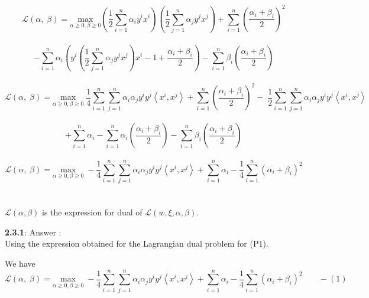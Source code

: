 \documentclass[a4paper,11pt]{article}
\begin{document}
\begin{mlsolution}
\[
  \mathcal{L}\left ( \alpha,\; \beta  \right ) = \underset{\alpha\geq 0, \beta \geq 0 }{\text{max}} \left ( \frac{1}{2}\sum_{i=1}^{n} \alpha_{i}y^{i}x^{i}  \right )\left ( \frac{1}{2}\sum_{j=1}^{n} \alpha_{j}y^{j}x^{j} \right ) + \sum_{i=1}^{n} \left ( \frac{\alpha_{i} + \beta_{i}}{2} \right )^{2}  \]\\\[ - \sum_{i=1}^{n} \alpha_{i}\left ( y^{i}\left ( \frac{1}{2}\sum_{j=1}^{n} \alpha_{j}y^{j}x^{j}  \right )x^{i} - 1  +  \frac{\alpha_{i} + \beta_{i}}{2} \right ) - \sum_{i=1}^{n} \beta_{i} \left ( \frac{\alpha_{i} + \beta_{i}}{2}  \right )
\]\\

\[
  \mathcal{L}\left ( \alpha,\; \beta  \right ) = \underset{\alpha\geq 0, \beta \geq 0 }{\text{max}} \; \frac{1}{4}\sum_{i=1}^{n}\sum_{j=1}^{n}\alpha_{i}\alpha_{j}y^{i}y^{j}\left \langle x^{i}, x^{j} \right \rangle+ \sum_{i=1}^{n} \left ( \frac{\alpha_{i} + \beta_{i}}{2} \right )^{2} -\; \frac{1}{2}\sum_{i=1}^{n}\sum_{j=1}^{n}\alpha_{i}\alpha_{j}y^{i}y^{j}\left \langle x^{i}, x^{j} \right \rangle \]\\\[ + \sum_{i=1}^{n}\alpha_{i} - \sum_{i=1}^{n} \alpha_{i} \left ( \frac{\alpha_{i} + \beta_{i}}{2}  \right ) - \sum_{i=1}^{n} \beta_{i} \left ( \frac{\alpha_{i} + \beta_{i}}{2}  \right )
\]\\

\[
  \mathcal{L}\left ( \alpha,\; \beta  \right ) = \underset{\alpha\geq 0, \beta \geq 0 }{\text{max}} \; -\frac{1}{4}\sum_{i=1}^{n}\sum_{j=1}^{n}\alpha_{i}\alpha_{j}y^{i}y^{j}\left \langle x^{i}, x^{j} \right \rangle+ \sum_{i=1}^{n}\alpha_{i} - \frac{1}{4}\sum_{i=1}^{n} \left ( \alpha_{i} + \beta_{i} \right )^{2}
\]\\\\

$\mathcal{L}(\alpha, \beta)$ is the expression for dual of $\mathcal{L}(w, \xi, \alpha, \beta)$.\\
\newpage

\textbf{2.3.1}: Answer : \\

Using the expression obtained for the Lagrangian dual problem for (P1).

We have 
\[
  \mathcal{L}\left ( \alpha,\; \beta  \right ) = \underset{\alpha\geq 0, \beta \geq 0 }{\text{max}} \; -\frac{1}{4}\sum_{i=1}^{n}\sum_{j=1}^{n}\alpha_{i}\alpha_{j}y^{i}y^{j}\left \langle x^{i}, x^{j} \right \rangle+ \sum_{i=1}^{n}\alpha_{i} - \frac{1}{4}\sum_{i=1}^{n} \left ( \alpha_{i} + \beta_{i} \right )^{2} \;\;\;\;\;\;\; - (1)
\]\\


\end{mlsolution}
\end{document}
